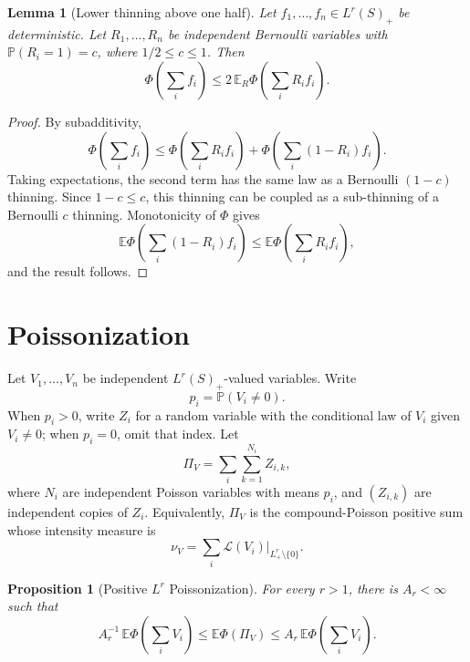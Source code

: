 \documentclass[11pt]{article}
\newtheorem{proposition}{Proposition}
\newtheorem{lemma}{Lemma}
\newcommand{\E}{\mathbb E}
\newcommand{\Pp}{\mathbb P}
\newcommand{\PhiF}{\Phi}
\begin{document}
\begin{lemma}[Lower thinning above one half]
\label{lem:lower-thin}
Let \(f_1,\ldots,f_n\in L^r(S)_+\) be deterministic.  Let
\(R_1,\ldots,R_n\) be independent Bernoulli variables with
\(\Pp(R_i=1)=c\), where \(1/2\le c\le1\).  Then
\[
  \PhiF\left(\sum_i f_i\right)
  \le
  2\,\E_R\PhiF\left(\sum_i R_i f_i\right).
\]
\end{lemma}

\begin{proof}
By subadditivity,
\[
  \PhiF\left(\sum_i f_i\right)
  \le
  \PhiF\left(\sum_i R_i f_i\right)
  +
  \PhiF\left(\sum_i (1-R_i)f_i\right).
\]
Taking expectations, the second term has the same law as a Bernoulli
\((1-c)\) thinning.  Since \(1-c\le c\), this thinning can be coupled as a
sub-thinning of a Bernoulli \(c\) thinning.  Monotonicity of \(\PhiF\) gives
\[
  \E\PhiF\left(\sum_i (1-R_i)f_i\right)
  \le
  \E\PhiF\left(\sum_i R_i f_i\right),
\]
and the result follows.
\end{proof}

\section*{Poissonization}

Let \(V_1,\ldots,V_n\) be independent \(L^r(S)_+\)-valued variables.  Write
\[
  p_i=\Pp(V_i\ne0).
\]
When \(p_i>0\), write \(Z_i\) for a random variable with the conditional law
of \(V_i\) given \(V_i\ne0\); when \(p_i=0\), omit that index.  Let
\[
  \Pi_V=\sum_i\sum_{k=1}^{N_i} Z_{i,k},
\]
where \(N_i\) are independent Poisson variables with means \(p_i\), and
\((Z_{i,k})\) are independent copies of \(Z_i\).  Equivalently, \(\Pi_V\) is
the compound-Poisson positive sum whose intensity measure is
\[
  \nu_V=\sum_i\mathcal L(V_i)|_{L^r_+\setminus\{0\}}.
\]

\begin{proposition}[Positive \(L^r\) Poissonization]
\label{prop:poisson}
For every \(r>1\), there is \(A_r<\infty\) such that
\[
  A_r^{-1}\,
  \E\PhiF\left(\sum_i V_i\right)
  \le
  \E\PhiF(\Pi_V)
  \le
  A_r\,
  \E\PhiF\left(\sum_i V_i\right).
\]
\end{proposition}
\end{document}

